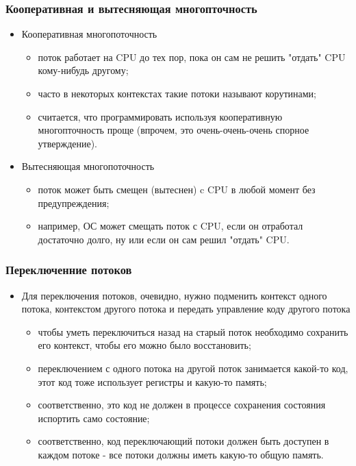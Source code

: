 \begin{frame}
\frametitle{Кооперативная и вытесняющая многопточность}
\begin{itemize}
  \item Кооперативная многопоточность
  \begin{itemize}
    \item поток работает на CPU до тех пор, пока он сам не решить "отдать" CPU
    кому-нибудь другому;
    \item часто в некоторых контекстах такие потоки называют корутинами;
    \item считается, что программировать используя кооперативную многопточность
    проще (впрочем, это очень-очень-очень спорное утверждение).
  \end{itemize}
  \item Вытесняющая многопоточность
  \begin{itemize}
    \item поток может быть смещен (вытеснен) c CPU в любой момент без
    предупреждения;
    \item например, ОС может смещать поток с CPU, если он отработал достаточно
    долго, ну или если он сам решил "отдать" CPU.
  \end{itemize}
\end{itemize}
\end{frame}

\begin{frame}
\frametitle{Переключенние потоков}
\begin{itemize}
  \item Для переключения потоков, очевидно, нужно подменить контекст одного
  потока, контекстом другого потока и передать управление коду другого потока
  \begin{itemize}
    \item чтобы уметь переключиться назад на старый поток необходимо сохранить
    его контекст, чтобы его можно было восстановить;
    \item переключением с одного потока на другой поток занимается какой-то
    код, этот код тоже использует регистры и какую-то память;
    \item соответственно, это код не должен в процессе сохранения состояния
    испортить само состояние;
    \item соответственно, код переключающий потоки должен быть доступен в каждом
    потоке - все потоки должны иметь какую-то общую память.
  \end{itemize}
\end{itemize}
\end{frame}

